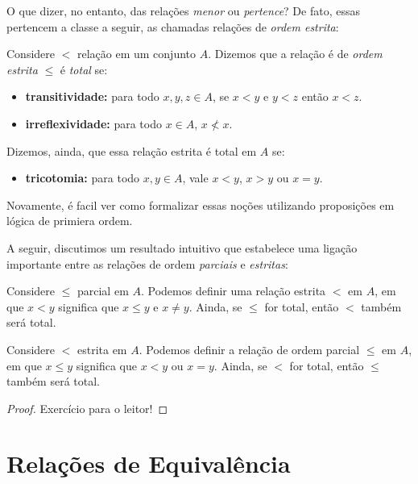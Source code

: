 O que dizer, no entanto, das relações \textit{menor} ou \textit{pertence}? De fato, essas pertencem a classe a seguir, as chamadas relações de \textit{ordem estrita}:

\begin{definition}
    \label{estrict_order}
    Considere $<$ relação em um conjunto $A$. Dizemos que a relação é de \textit{ordem estrita} $\leq$ é \textit{total} se:

    \begin{itemize}
        \item \textbf{transitividade: } para todo $x,y,z \in A$, se $x<y$ e $y<z$ então $x<z$.
        \item \textbf{irreflexividade: } para todo $x\in A$, $x \nless x$.
    \end{itemize}
    Dizemos, ainda, que essa relação estrita é total em $A$ se:
    \begin{itemize}
        \item \textbf{tricotomia:} para todo $x,y \in A$, vale $x<y$, $x>y$ ou $x=y$.
    \end{itemize}
\end{definition}

\noindent Novamente, é facil ver como formalizar essas noções utilizando proposições em lógica de primiera ordem.


A seguir, discutimos um resultado intuitivo que estabelece uma ligação importante entre as relações de ordem \textit{parciais} e \textit{estritas}:

\begin{theorem}
    \label{estrict_by_partial}
    Considere $\leq$ parcial em $A$. Podemos definir uma relação estrita $<$ em $A$, em que $x<y$ significa que $x\leq y$ e $x \neq y$. Ainda, se $\leq $ for total, então $<$ também será total.
\end{theorem}
\begin{theorem}
    \label{partial_by_estrict}
    Considere $<$ estrita em $A$. Podemos definir a relação de ordem parcial $\leq $ em $A$, em que $x\leq y$ significa que $x < y$ ou $x = y$. Ainda, se $<$ for total, então $\leq$ também será total.
\end{theorem}

\begin{proof}
    Exercício para o leitor!
\end{proof}
\section{Relações de Equivalência}


